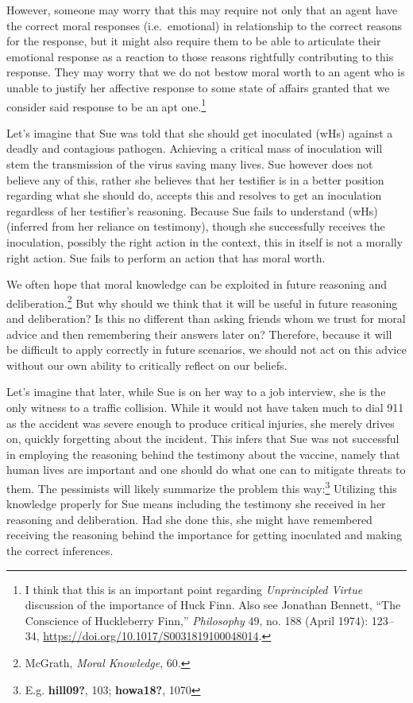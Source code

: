\documentclass[phdthesis,12pt,final]{wuthesis}
\theoremstyle{definition}
\theoremstyle{definition}
\theoremstyle{definition}
\theoremstyle{definition}
\theoremstyle{remark}
\begin{document}
However, someone may worry that this may require not only that an agent have the correct moral responses (i.e.~emotional) in relationship to the correct reasons for the response, but it might also require them to be able to articulate their emotional response as a reaction to those reasons rightfully contributing to this response. They may worry that we do not bestow moral worth to an agent who is unable to justify her affective response to some state of affairs granted that we consider said response to be an apt one.\footnote{I think that this is an important point regarding \emph{Unprincipled {Virtue}} discussion of the importance of Huck Finn. Also see Jonathan Bennett, {``The {Conscience} of {Huckleberry Finn},''} \emph{Philosophy} 49, no. 188 (April 1974): 123--34, \url{https://doi.org/10.1017/S0031819100048014}.}

Let's imagine that Sue was told that she should get inoculated (wHs) against a deadly and contagious pathogen. Achieving a critical mass of inoculation will stem the transmission of the virus saving many lives. Sue however does not believe any of this, rather she believes that her testifier is in a better position regarding what she should do, accepts this and resolves to get an inoculation regardless of her testifier's reasoning. Because Sue fails to understand (wHs) (inferred from her reliance on testimony), though she successfully receives the inoculation, possibly the right action in the context, this in itself is not a morally right action. Sue fails to perform an action that has moral worth.

We often hope that moral knowledge can be exploited in future reasoning and deliberation.\footnote{McGrath, \emph{Moral {Knowledge}}, 60.} But why should we think that it will be useful in future reasoning and deliberation? Is this no different than asking friends whom we trust for moral advice and then remembering their answers later on? Therefore, because it will be difficult to apply correctly in future scenarios, we should not act on this advice without our own ability to critically reflect on our beliefs.

Let's imagine that later, while Sue is on her way to a job interview, she is the only witness to a traffic collision. While it would not have taken much to dial 911 as the accident was severe enough to produce critical injuries, she merely drives on, quickly forgetting about the incident. This infers that Sue was not successful in employing the reasoning behind the testimony about the vaccine, namely that human lives are important and one should do what one can to mitigate threats to them. The pessimists will likely summarize the problem this way:\footnote{E.g. \textbf{hill09?}, 103; \textbf{howa18?}, 1070} Utilizing this knowledge properly for Sue means including the testimony she received in her reasoning and deliberation. Had she done this, she might have remembered receiving the reasoning behind the importance for getting inoculated and making the correct inferences.
\end{document}
